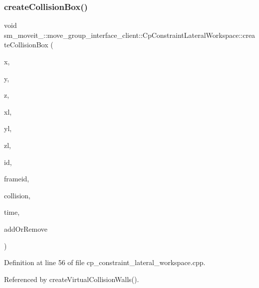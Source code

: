 \subsubsection{\texorpdfstring{create\+Collision\+Box()}{createCollisionBox()}}
{\footnotesize\ttfamily void sm\+\_\+moveit\+\_\+::move\+\_\+group\+\_\+interface\+\_\+client\+::\+Cp\+Constraint\+Lateral\+Workspace\+::create\+Collision\+Box (\begin{DoxyParamCaption}\item[{float}]{x,  }\item[{float}]{y,  }\item[{float}]{z,  }\item[{float}]{xl,  }\item[{float}]{yl,  }\item[{float}]{zl,  }\item[{std\+::string}]{id,  }\item[{std\+::string}]{frameid,  }\item[{moveit\+\_\+msgs\+::\+Collision\+Object \&}]{collision,  }\item[{const ros\+::\+Time \&}]{time,  }\item[{int}]{add\+Or\+Remove }\end{DoxyParamCaption})}



Definition at line 56 of file cp\+\_\+constraint\+\_\+lateral\+\_\+workspace.\+cpp.



Referenced by create\+Virtual\+Collision\+Walls().


